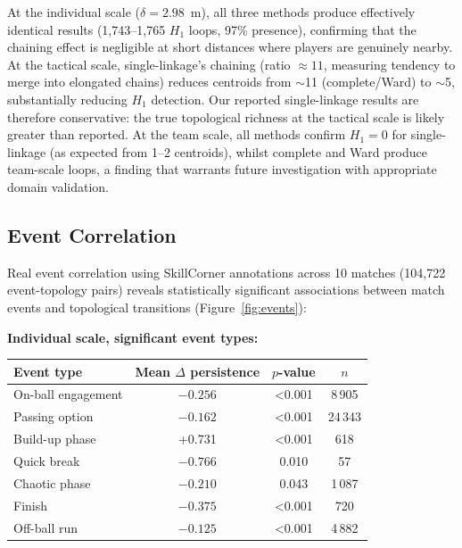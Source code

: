 At the individual scale (\(\delta=2.98\)~m), all three methods produce effectively identical results (1,743--1,765 \(H_1\) loops, 97\% presence), confirming that the chaining effect is negligible at short distances where players are genuinely nearby. At the tactical scale, single-linkage's chaining (ratio \(\approx 11\), measuring tendency to merge into elongated chains) reduces centroids from \(\sim\)11 (complete/Ward) to \(\sim\)5, substantially reducing \(H_1\) detection. Our reported single-linkage results are therefore conservative: the true topological richness at the tactical scale is likely greater than reported. At the team scale, all methods confirm \(H_1=0\) for single-linkage (as expected from 1--2 centroids), whilst complete and Ward produce team-scale loops, a finding that warrants future investigation with appropriate domain validation.

\subsection{Event Correlation}
\label{sec:event_correlation}

Real event correlation using SkillCorner annotations across 10 matches (104,722 event-topology pairs) reveals statistically significant associations between match events and topological transitions (Figure~\ref{fig:events}):

\textbf{Individual scale, significant event types:}

\begin{table}[H]
  \centering
  \begin{tabular}{@{}lccc@{}}
    \toprule
    Event type & Mean \(\Delta\) persistence & \(p\)-value & \(n\) \\
    \midrule
    On-ball engagement & \(-0.256\) & \textless0.001 & 8\,905 \\
    Passing option     & \(-0.162\) & \textless0.001 & 24\,343 \\
    Build-up phase       & +0.731 & \textless0.001 & 618 \\
    Quick break          & \(-0.766\) & 0.010 & 57 \\
    Chaotic phase        & \(-0.210\) & 0.043 & 1\,087 \\
    Finish               & \(-0.375\) & \textless0.001 & 720 \\
    Off-ball run         & \(-0.125\) & \textless0.001 & 4\,882 \\
    \bottomrule
  \end{tabular}
\end{table}

